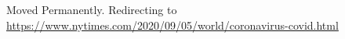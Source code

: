 Moved Permanently. Redirecting to
\url{https://www.nytimes.com/2020/09/05/world/coronavirus-covid.html}

